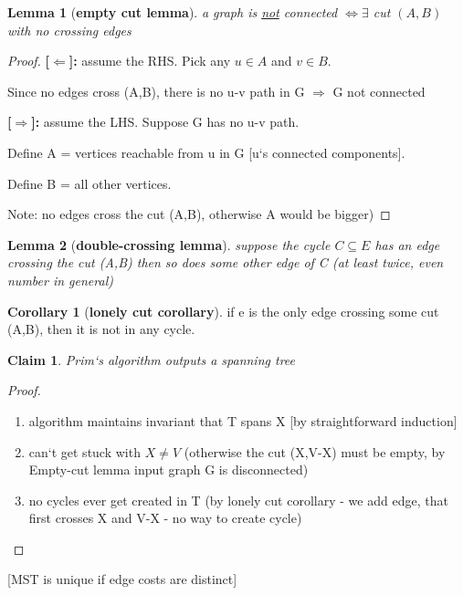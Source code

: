 \documentclass[a4paper,12pt]{article}
\theoremstyle{plain}
\newtheorem*{lemma}{Lemma}
\newtheorem{claim}{Claim}
\theoremstyle{definition}
\newtheorem*{corollary}{Corollary}
\theoremstyle{remark}
\begin{document}
\begin{lemma}[\textbf{empty cut lemma}] a graph is \underline{not} connected $\iff \exists$ cut $(A,B)$ with no crossing edges\end{lemma}
\begin{proof}

\textbf{[$\Leftarrow$]:} assume the RHS. Pick any $u \in A$ and $v \in B$.

Since no edges cross (A,B), there is no u-v path in G $\Rightarrow$ G not connected

\textbf{[$\Rightarrow$]:} assume the LHS. Suppose G has no u-v path.

Define A = {vertices reachable from u in G} [u`s connected components].

Define B = {all other vertices}.

Note: no edges cross the cut (A,B), otherwise A would be bigger)
\end{proof}

\begin{lemma}[\textbf{double-crossing lemma}] suppose the cycle $C \subseteq E$ has an edge crossing the cut (A,B) then so does some other edge of C (at least twice, even number in general)\end{lemma}

\begin{corollary}[\textbf{lonely cut corollary}] if e is the only edge crossing some cut (A,B), then it is not in any cycle.\end{corollary}

\begin{claim} Prim`s algorithm outputs a spanning tree\end{claim}
\begin{proof}
\begin{enumerate}
	\item algorithm maintains invariant that T spans X [by straightforward induction]
	\item can`t get stuck with $X \neq V$ (otherwise the cut (X,V-X) must be empty, by Empty-cut lemma input graph G is disconnected)
	\item no cycles ever get created in T (by lonely cut corollary - we add edge, that first crosses X and V-X - no way to create cycle)
\end{enumerate}
\end{proof}

[MST is unique if edge costs are distinct]
\end{document}
